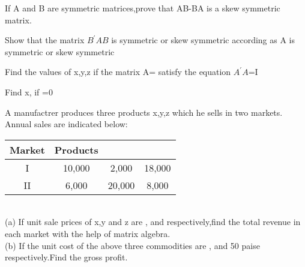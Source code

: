  \item If A and B are symmetric matrices,prove that AB-BA is a skew symmetric matrix.\\
  \item Show that the matrix $ B^{'}AB$ is symmetric or skew symmetric according as A is symmetric or skew symmetric\\
  
  \item Find the values of x,y,z if the matrix A= satisfy the equation $A^{'}A$=I\\

  \item Find x, if =0\\
  \item A manufactrer produces three products x,y,z which he sells in two markets. Annual sales are indicated below:\\
 
  \begin{tabular}{cccc}
  \hline
  Market & Products\\
  \hline
  I &10,000 &2,000 &18,000\\
  \hline
  II &6,000 &20,000 &8,000\\
  \hline
  \end{tabular}\\
  (a) If unit sale prices of x,y and z are , and  respectively,find the total revenue in each market with the help of matrix algebra.\\
  (b) If the unit cost of the above three commodities are , and 50 paise respectively.Find the gross profit.\\

